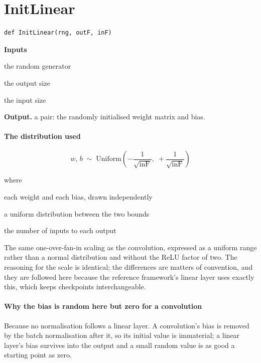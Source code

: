 \section{InitLinear}
\begin{lstlisting}[style=sig]
def InitLinear(rng, outF, inF)
\end{lstlisting}

\noindent\textbf{Inputs}
\begin{description}[leftmargin=2.2em,style=nextline,font=\normalfont\ttfamily]\setlength\itemsep{1pt}
  \item[{rng}] \normalfont the random generator
  \item[{outF}] \normalfont the output size
  \item[{inF}] \normalfont the input size
\end{description}

\noindent\textbf{Output.} a pair: the randomly initialised weight matrix and bias.


\paragraph{The distribution used}

\begin{equation}
w,\, b \;\sim\; \mathrm{Uniform}\!\left(-\frac{1}{\sqrt{\mathrm{inF}}},\; +\frac{1}{\sqrt{\mathrm{inF}}}\right)
\end{equation}

\noindent where
\begin{description}[leftmargin=2.4em,style=nextline,font=\normalfont\ttfamily]\setlength\itemsep{1pt}
  \item[{$w,\,b$}] \normalfont each weight and each bias, drawn independently
  \item[{$\mathrm{Uniform}(a,b)$}] \normalfont a uniform distribution between the two bounds
  \item[{$\mathrm{inF}$}] \normalfont the number of inputs to each output
\end{description}
The same one-over-fan-in scaling as the convolution, expressed as a uniform range rather than a normal distribution and without the ReLU factor of two. The reasoning for the scale is identical; the differences are matters of convention, and they are followed here because the reference framework's linear layer uses exactly this, which keeps checkpoints interchangeable.


\paragraph{Why the bias is random here but zero for a convolution}
Because no normalisation follows a linear layer. A convolution's bias is removed by the batch normalisation after it, so its initial value is immaterial; a linear layer's bias survives into the output and a small random value is as good a starting point as zero.


